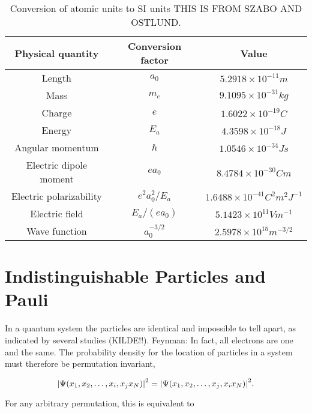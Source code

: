         \begin{table}
            \centering
            \caption{Conversion of atomic units to SI units THIS IS FROM SZABO AND OSTLUND.}
            \begin{tabular}{ccc} \hline
                Physical quantity & Conversion factor & Value \\ \hline
                Length  & $a_0$ & $5.2918 \times 10^{-11} m$ \\
                Mass    & $m_e$ & $9.1095 \times 10^{-31} kg$ \\
                Charge  & $e$   & $1.6022 \times 10^{-19} C$ \\
                Energy  & $E_a$ & $4.3598 \times 10^{-18} J$ \\
                Angular momentum & $\hbar$ &  $1.0546 \times 10^{-34} Js$ \\
                Electric dipole moment & $ea_0$& $8.4784 \times 10^{-30} Cm$ \\
                Electric polarizability & $e^2a_0^2/E_a$ & $1.6488 \times 10^{-41} C^2m^2J^{-1}$ \\
                Electric field & $E_a/(ea_0)$ & $5.1423 \times 10^{11} Vm^{-1} $ \\
                Wave function & $a_0^{-3/2}$ & $2.5978 \times 10^{15} m^{-3/2}$ \\ \hline
            \end{tabular}
            \label{tab:atomic_units_conversion}
        \end{table}




    \section{Indistinguishable Particles and Pauli}

        In a quantum system the particles are identical and impossible to tell
        apart, as indicated by several studies (KILDE!!). 
        Feynman: In fact, all electrons are one and the same.
        The probability density
        for the location of particles in a system must therefore be permutation
        invariant,

        \begin{equation}
            \abs{\Psi(x_1, x_2, \dots, x_i, x_j x_N)}^2 
            = 
            \abs{\Psi(x_1, x_2, \dots, x_j, x_i x_N)}^2.
        \end{equation}

        For any arbitrary permutation, this is equivalent to 

